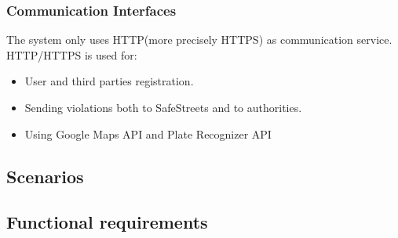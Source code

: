 \documentclass{article}
\begin{document}
\subsubsection{Communication Interfaces}
The system only uses HTTP(more precisely HTTPS) as communication service.
HTTP/HTTPS is used for:
\begin{itemize}
    \item User and third parties registration.
    \item Sending violations both to SafeStreets and to authorities.
    \item Using Google Maps API and Plate Recognizer API
\end{itemize}
\subsection{Scenarios}
\subsection{Functional requirements}
\end{document}
